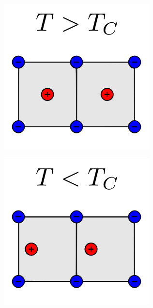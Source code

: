 \begin{figure}
\begin{subfigure}{0.3\textwidth}
\centering
	\includegraphics[width=0.9\linewidth]{./figs/chap1/ferroscheme1}
	\caption{}
	\label{fig:ferroscheme1}
\end{subfigure}
\begin{subfigure}{0.3\textwidth}
\centering
	\includegraphics[width=0.9\linewidth]{./figs/chap1/ferroscheme2}

\end{subfigure}
\end{figure}
